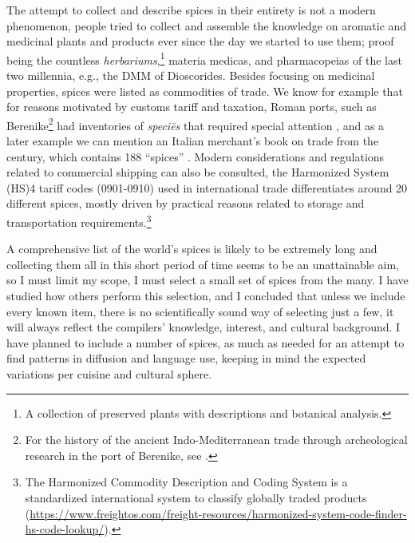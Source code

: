 The attempt to collect and describe spices in their entirety is not a modern phenomenon, people tried to collect and assemble the knowledge on aromatic and medicinal plants and products ever since the day we started to use them; proof being the countless \textit{herbariums},\footnote{A collection of preserved plants with descriptions and botanical analysis.} \glspl{materia medica}, and \glspl{pharmacopeia} of the last two millennia, e.g., the \gls{DMM} of Dioscorides. Besides focusing on medicinal properties, spices were listed as commodities of trade. We know for example that for reasons motivated by customs tariff and taxation, Roman ports, such as Berenike\footnote{For the history of the ancient Indo-Mediterranean trade through archeological research in the port of Berenike, see \textcite{sidebotham_berenike_2011}.} had inventories of \textit{speciēs} that required special attention \autocite{parthasarathi_roman_2015}, and as a later example we can mention an Italian merchant's book on trade from the  century, which contains 188 ``spices'' \autocite[411-435]{pegolotti_pratica_1936}. Modern considerations and regulations related to commercial shipping can also be consulted, the Harmonized System (HS)4 tariff codes (0901-0910) used in international trade differentiates around 20 different spices, mostly driven by practical reasons related to storage and transportation requirements.\footnote{The Harmonized Commodity Description and Coding System is a standardized international system to classify globally traded products (\url{https://www.freightos.com/freight-resources/harmonized-system-code-finder-hs-code-lookup/}).}


A comprehensive list of the world's spices is likely to be extremely long and collecting them all in this short period of time seems to be an unattainable aim, so I must limit my scope, I must select a small set of spices from the many. I have studied how others perform this selection, and I concluded that unless we include every known item, there is no scientifically sound way of selecting just a few, it will always reflect the compilers' knowledge, interest, and cultural background. I have planned to include a number of spices, as much as needed for an attempt to find patterns in diffusion and language use, keeping in mind the expected variations per cuisine and cultural sphere. 



